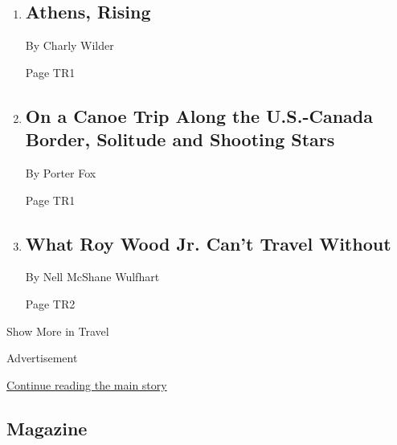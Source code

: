 \begin{enumerate}
\def\labelenumi{\arabic{enumi}.}
\item
  \href{/2018/06/18/travel/athens-after-the-economic-crisis.html}{}

  \hypertarget{athens-rising}{%
  \subsection{Athens, Rising}\label{athens-rising}}

  By Charly Wilder

  Page TR1
\item
  \href{/2018/06/20/travel/canoe-trip-maine-canada-border.html}{}

  \hypertarget{on-a-canoe-trip-along-the-us-canada-border-solitude-and-shooting-stars}{%
  \subsection{On a Canoe Trip Along the U.S.-Canada Border, Solitude and
  Shooting
  Stars}\label{on-a-canoe-trip-along-the-us-canada-border-solitude-and-shooting-stars}}

  By Porter Fox

  Page TR1
\item
  \href{/2018/06/22/travel/roy-wood-jr-travel-tips.html}{}

  \hypertarget{what-roy-wood-jr-cant-travel-without}{%
  \subsection{What Roy Wood Jr. Can't Travel
  Without}\label{what-roy-wood-jr-cant-travel-without}}

  By Nell McShane Wulfhart

  Page TR2
\end{enumerate}

Show More in Travel

Advertisement

\protect\hyperlink{after-mid5}{Continue reading the main story}

\hypertarget{magazine}{%
\subsection{Magazine}\label{magazine}}

